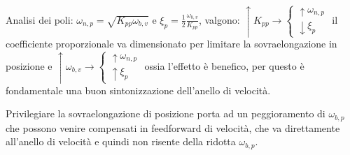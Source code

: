 Analisi dei poli: \(\omega_{n,p} = \sqrt{K_{pp} \omega_{b,v}}\) e \(\xi_p = \frac{1}{2}\frac{\omega_{b,v}}{K_{pp}}\), valgono:
\( \uparrow K_{pp} \rightarrow \begin{cases}
    \uparrow \omega_{n,p} \\
    \downarrow \xi_p
\end{cases}
\) il coefficiente proporzionale va dimensionato per limitare la sovraelongazione in posizione e \( \uparrow \omega_{b,v} \rightarrow \begin{cases}
    \uparrow \omega_{n,p} \\
    \uparrow \xi_p
\end{cases}
\) ossia l'effetto è benefico, per questo è fondamentale una buon sintonizzazione dell'anello di velocità.

Privilegiare la sovraelongazione di posizione porta ad un peggioramento di \(\omega_{b,p}\) che possono venire compensati in feedforward di velocità, che va direttamente all'anello di velocità e quindi non risente della ridotta \(\omega_{b,p}\).


